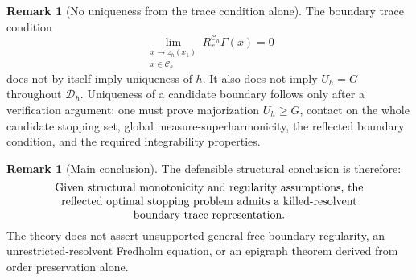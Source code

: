 \documentclass[pdflatex,sn-mathphys-num]{sn-jnl}
\theoremstyle{plain}
\theoremstyle{definition}
\newtheorem{remark}[theorem]{Remark}
\begin{document}
\begin{remark}[No uniqueness from the trace condition alone]
\label{rem:no-uniqueness-from-trace}
The boundary trace condition
\[
   \lim_{\substack{x\to z_h(x_1)\\ x\in\mathcal C_h}}R_r^{\mathcal C_h}\Gamma(x)=0
\]
does not
by itself imply uniqueness of $h$. It also does not imply $U_h=G$ throughout
$\mathcal D_h$. Uniqueness of a candidate boundary follows only after a
verification argument: one must prove majorization $U_h\ge G$, contact on the
whole candidate stopping set, global measure-superharmonicity, the reflected
boundary condition, and the required integrability properties.
\end{remark}

\begin{remark}[Main conclusion]
\label{rem:main-corrected-conclusion}
The defensible structural conclusion is therefore:
\[
   \begin{minipage}{0.86\linewidth}
   \centering
   Given structural monotonicity and regularity assumptions, the reflected
   optimal stopping problem admits a killed-resolvent boundary-trace
   representation.
   \end{minipage}
\]
The theory does not assert unsupported general free-boundary regularity, an
unrestricted-resolvent Fredholm equation, or an epigraph theorem derived from
order preservation alone.
\end{remark}

\end{document}

